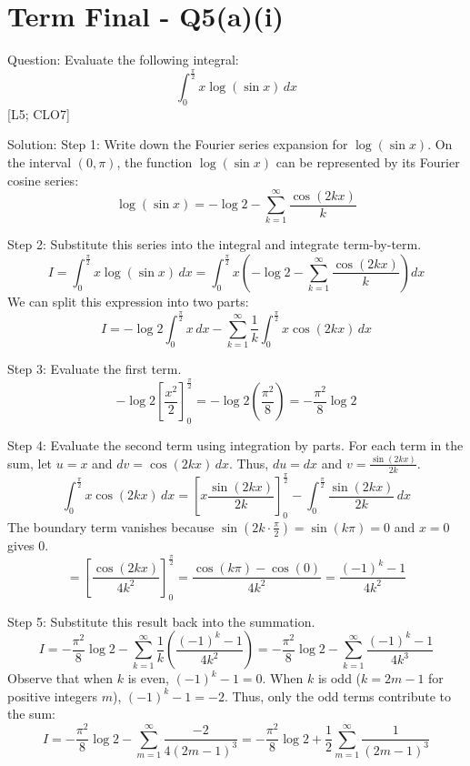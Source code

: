 \documentclass[11pt, a4paper]{article}
\begin{document}


\section*{Term Final - Q5(a)(i)}

Question:
Evaluate the following integral:
\[
\int_{0}^{\frac{\pi}{2}} x \log(\sin x) \, dx
\]
[L5; CLO7]

Solution:
Step 1: Write down the Fourier series expansion for $\log(\sin x)$.
On the interval $(0, \pi)$, the function $\log(\sin x)$ can be represented by its Fourier cosine series:
\[
\log(\sin x) = -\log 2 - \sum_{k=1}^{\infty} \frac{\cos(2kx)}{k}
\]

Step 2: Substitute this series into the integral and integrate term-by-term.
\[
I = \int_{0}^{\frac{\pi}{2}} x \log(\sin x) \, dx = \int_{0}^{\frac{\pi}{2}} x \left( -\log 2 - \sum_{k=1}^{\infty} \frac{\cos(2kx)}{k} \right) dx
\]
We can split this expression into two parts:
\[
I = -\log 2 \int_{0}^{\frac{\pi}{2}} x \, dx - \sum_{k=1}^{\infty} \frac{1}{k} \int_{0}^{\frac{\pi}{2}} x \cos(2kx) \, dx
\]

Step 3: Evaluate the first term.
\[
-\log 2 \left[ \frac{x^2}{2} \right]_{0}^{\frac{\pi}{2}} = -\log 2 \left( \frac{\pi^2}{8} \right) = -\frac{\pi^2}{8} \log 2
\]

Step 4: Evaluate the second term using integration by parts.
For each term in the sum, let $u = x$ and $dv = \cos(2kx) \, dx$. Thus, $du = dx$ and $v = \frac{\sin(2kx)}{2k}$.
\[
\int_{0}^{\frac{\pi}{2}} x \cos(2kx) \, dx = \left[ x \frac{\sin(2kx)}{2k} \right]_{0}^{\frac{\pi}{2}} - \int_{0}^{\frac{\pi}{2}} \frac{\sin(2kx)}{2k} \, dx
\]
The boundary term vanishes because $\sin(2k \cdot \frac{\pi}{2}) = \sin(k\pi) = 0$ and $x = 0$ gives $0$.
\[
= \left[ \frac{\cos(2kx)}{4k^2} \right]_{0}^{\frac{\pi}{2}} = \frac{\cos(k\pi) - \cos(0)}{4k^2} = \frac{(-1)^k - 1}{4k^2}
\]

Step 5: Substitute this result back into the summation.
\[
I = -\frac{\pi^2}{8} \log 2 - \sum_{k=1}^{\infty} \frac{1}{k} \left( \frac{(-1)^k - 1}{4k^2} \right) = -\frac{\pi^2}{8} \log 2 - \sum_{k=1}^{\infty} \frac{(-1)^k - 1}{4k^3}
\]
Observe that when $k$ is even, $(-1)^k - 1 = 0$. When $k$ is odd ($k = 2m-1$ for positive integers $m$), $(-1)^k - 1 = -2$.
Thus, only the odd terms contribute to the sum:
\[
I = -\frac{\pi^2}{8} \log 2 - \sum_{m=1}^{\infty} \frac{-2}{4(2m-1)^3} = -\frac{\pi^2}{8} \log 2 + \frac{1}{2} \sum_{m=1}^{\infty} \frac{1}{(2m-1)^3}
\]
\end{document}
